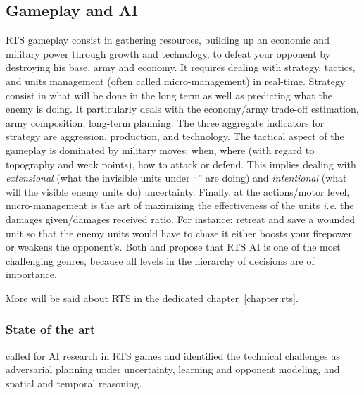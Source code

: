 \subsection{Gameplay and AI}
RTS gameplay consist in gathering resources, building up an economic and military power through growth and technology, to defeat your opponent by destroying his base, army and economy. It requires dealing with strategy, tactics, and units management (often called micro-management) in real-time. Strategy consist in what will be done in the long term as well as predicting what the enemy is doing. It particularly deals with the economy/army trade-off estimation, army composition, long-term planning. The three aggregate indicators for strategy are aggression, production, and technology. The tactical aspect of the gameplay is dominated by military moves: when, where (with regard to topography and weak points), how to attack or defend. This implies dealing with \textit{extensional} (what the invisible units under ``'' are doing) and \textit{intentional} (what will the visible enemy units do) uncertainty. Finally, at the actions/motor level, micro-management is the art of maximizing the effectiveness of the units \textit{i.e.} the damages given/damages received ratio. For instance: retreat and save a wounded unit so that the enemy units would have to chase it either boosts your firepower or weakens the opponent's. Both \citep{Human-LevelAIKillerApplication} and \cite{gunn} propose that RTS AI is one of the most challenging genres, because all levels in the hierarchy of decisions are of importance.

More will be said about RTS in the dedicated chapter~\ref{chapter:rts}.

\subsubsection{State of the art}
\citet{Buro04callfor} called for AI research in RTS games and identified the technical challenges as adversarial planning under uncertainty, learning and opponent modeling, and spatial and temporal reasoning.  

